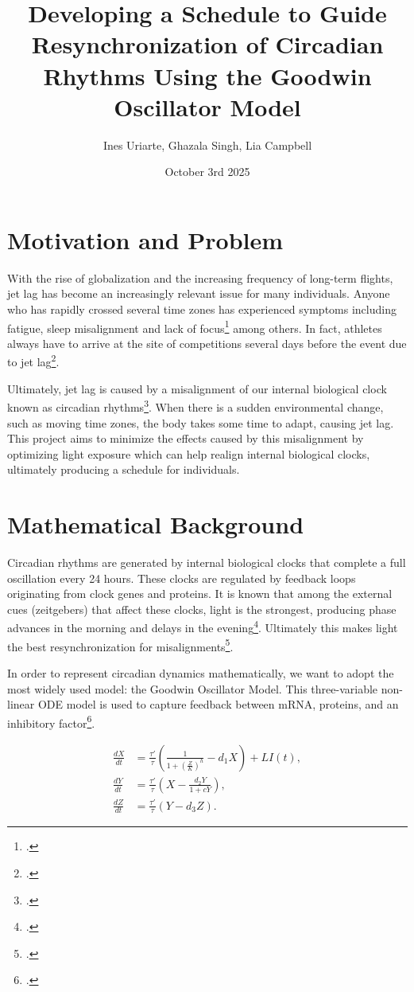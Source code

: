 \documentclass{article}
\title{Developing a Schedule to Guide Resynchronization of Circadian Rhythms Using the Goodwin Oscillator Model}
\author{Ines Uriarte, Ghazala Singh, Lia Campbell}
\date{October 3rd 2025}
\begin{document}
\maketitle

\section{Motivation and Problem}
\indent With the rise of globalization and the increasing frequency of long-term flights, jet lag has become an increasingly relevant issue for many individuals. Anyone who has rapidly crossed several time zones has experienced symptoms including fatigue, sleep misalignment and lack of focus\footcite{source1} among others. In fact, athletes always have to arrive at the site of competitions several days before the event due to jet lag\footcite{source2}.

Ultimately, jet lag is caused by a misalignment of our internal biological clock known as circadian rhythms\footcite{source1}. When there is a sudden environmental change, such as moving time zones, the body takes some time to adapt, causing jet lag. This project aims to minimize the effects caused by this misalignment by optimizing light exposure which can help realign internal biological clocks, ultimately producing a schedule for individuals.

\section{Mathematical Background}
\indent Circadian rhythms are generated by internal biological clocks that complete a full oscillation every 24 hours. These clocks are regulated by feedback loops originating from clock genes and proteins. It is known that among the external cues (zeitgebers) that affect these clocks, light is the strongest, producing phase advances in the morning and delays in the evening\footcite{source3}. Ultimately this makes light the best resynchronization for misalignments\footcite{source4}.

In order to represent circadian dynamics mathematically, we want to adopt the most widely used model: the Goodwin Oscillator Model. This three-variable non-linear ODE model is used to capture feedback between mRNA, proteins, and an inhibitory factor\footcite{source5}.

\begin{align}
\frac{dX}{dt} &= \frac{\tau'}{\tau} \left( \frac{1}{1+\left(\tfrac{Z}{K}\right)^{h}} - d_{1}X \right) + L I(t), \\[6pt]
\frac{dY}{dt} &= \frac{\tau'}{\tau} \left( X - \frac{d_{2}Y}{1+cY} \right), \\[6pt]
\frac{dZ}{dt} &= \frac{\tau'}{\tau} \left( Y - d_{3}Z \right).
\end{align}
\end{document}
